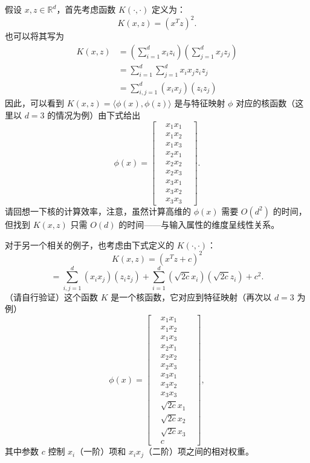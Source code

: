 假设 $x, z \in \mathbb{R}^d$，首先考虑函数 $K(\cdot, \cdot)$ 定义为：
\[
    K(x, z) = (x^T z)^2.
\]
也可以将其写为
\begin{align} 
    K(x, z) &= \left( \sum_{i=1}^d x_i z_i \right) \left( \sum_{j=1}^d x_j z_j \right) \\ &= \sum_{i=1}^d \sum_{j=1}^d x_i x_j z_i z_j \\ &= \sum_{i,j=1}^d (x_i x_j)(z_i z_j) 
\end{align}
因此，可以看到 $K(x, z) = \langle \phi(x), \phi(z) \rangle$ 是与特征映射 $\phi$ 对应的核函数（这里以 $d=3$ 的情况为例）由下式给出
\[
    \phi(x) = \begin{bmatrix}
        &x_1 x_1& \\
        &x_1 x_2& \\
        &x_1 x_3& \\
        &x_2 x_1& \\
        &x_2 x_2& \\
        &x_2 x_3& \\
        &x_3 x_1& \\
        &x_3 x_2& \\
        &x_3 x_3&
    \end{bmatrix}.
\]
请回想一下核的计算效率，注意，虽然计算高维的 $\phi(x)$ 需要 $O(d^2)$ 的时间，但找到 $K(x, z)$ 只需 $O(d)$ 的时间——与输入属性的维度呈线性关系。

对于另一个相关的例子，也考虑由下式定义的 $K(\cdot, \cdot)$：
\[
    K(x, z) = (x^T z + c)^2
\]
\[
    = \sum_{i,j=1}^d (x_i x_j)(z_i z_j) + \sum_{i=1}^d (\sqrt{2c} x_i)(\sqrt{2c} z_i) + c^2.
\]
（请自行验证）这个函数 $K$ 是一个核函数，它对应到特征映射（再次以 $d=3$ 为例）
\[
    \phi(x) = \begin{bmatrix}
        &x_1 x_1& \\
        &x_1 x_2& \\
        &x_1 x_3& \\
        &x_2 x_1& \\
        &x_2 x_2& \\
        &x_2 x_3& \\
        &x_3 x_1& \\
        &x_3 x_2& \\
        &x_3 x_3& \\
        &\sqrt{2c} x_1& \\
        &\sqrt{2c} x_2& \\
        &\sqrt{2c} x_3& \\
        &c&
    \end{bmatrix},
\]
其中参数 $c$ 控制 $x_i$（一阶）项和 $x_i x_j$（二阶）项之间的相对权重。

